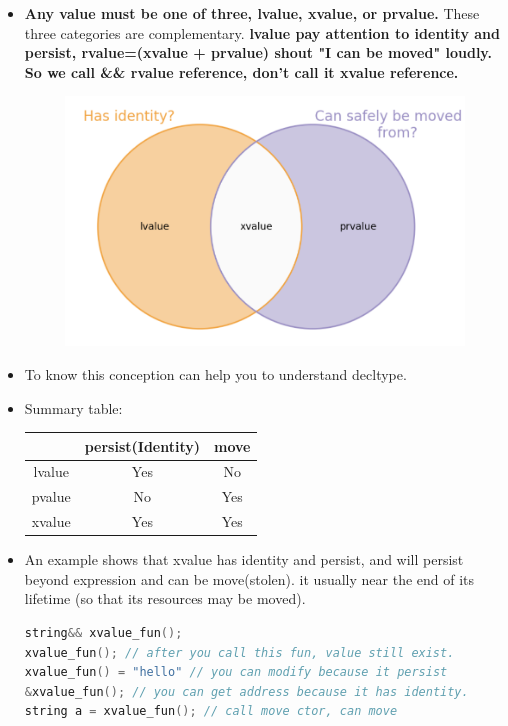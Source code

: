\documentclass[a4paper,12pt,twoside]{book}
\begin{document}
\begin{itemize}
	\item \textbf{Any value must be one of three, lvalue, xvalue, or prvalue.} These three categories are complementary.  \textbf{lvalue pay attention to  identity and persist, rvalue=(xvalue + prvalue) shout "I can be moved" loudly.  So we call \&\& rvalue reference, don't call it xvalue reference. }
	
	\begin{figure}
		\centering
		\includegraphics[width=0.7\linewidth]{pics/xvalue1.png}
		\caption{}
		\label{fig:xvalue1}
	\end{figure}
	
	
	\item To know this conception can help you to understand decltype. 
	
	\item Summary table: \newline
	\begin{tabular}{|c|c|c|}
		\hline
		& persist(Identity) & move \\
		\hline
		lvalue & Yes & No \\
		\hline
		pvalue & No & Yes \\
		\hline
		xvalue & Yes & Yes \\
		\hline
	\end{tabular}

\item An example shows that xvalue has identity and persist, and will persist beyond expression and can be move(stolen). it usually near the end of its lifetime (so that its resources may be moved).
\begin{lstlisting}[frame=single, language=c++, mathescape=true]
string&& xvalue_fun();
xvalue_fun(); // after you call this fun, value still exist.
xvalue_fun() = "hello" // you can modify because it persist
&xvalue_fun(); // you can get address because it has identity.
string a = xvalue_fun(); // call move ctor, can move
\end{lstlisting}


\end{itemize}
\end{document}
